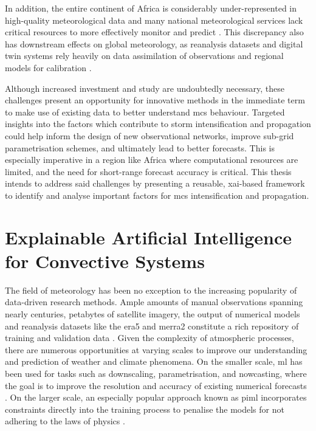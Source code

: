 In addition, the entire continent of Africa is considerably under-represented in high-quality meteorological data and many national meteorological services lack critical resources to more effectively monitor and predict  \citep{Dinku2019,Kinyondo2018,Meque2021}. This discrepancy also has downstream effects on global meteorology, as reanalysis datasets and digital twin systems rely heavily on data assimilation of observations and regional models for calibration \citep{Linsenmeier2023,Valmassoi2023}. 

Although increased investment and study are undoubtedly necessary, these challenges present an opportunity for innovative methods in the immediate term to make use of existing data to better understand \acrshort{mcs} behaviour. Targeted insights into the factors which contribute to storm intensification and propagation could help inform the design of new observational networks, improve sub-grid parametrisation schemes, and ultimately lead to better forecasts. This is especially imperative in a region like Africa where computational resources are limited, and the need for short-range forecast accuracy is critical. This thesis intends to address said challenges by presenting a reusable, \acrfull{xai}-based framework to identify and analyse important factors for \acrshort{mcs} intensification and propagation.

\section{Explainable Artificial Intelligence for Convective Systems}

The field of meteorology has been no exception to the increasing popularity of data-driven research methods. Ample amounts of manual observations spanning nearly centuries, petabytes of satellite imagery, the output of numerical models and reanalysis datasets like the \acrfull{era5} and \acrfull{merra2} constitute a rich repository of training and validation data \citep{Bracco2024,Waqas2024,Zhang2025}. Given the complexity of atmospheric processes, there are numerous opportunities at varying scales to improve our understanding and prediction of weather and climate phenomena. On the smaller scale, \acrfull{ml} has been used for tasks such as downscaling, parametrisation, and nowcasting, where the goal is to improve the resolution and accuracy of existing numerical forecasts \citep{Blunn2024,Zhang2023}. On the larger scale, an especially popular approach known as \acrfull{piml} incorporates constraints directly into the training process to penalise the models for not adhering to the laws of physics \citep{Pathak2022,Luo2025,Zhang2023}.

